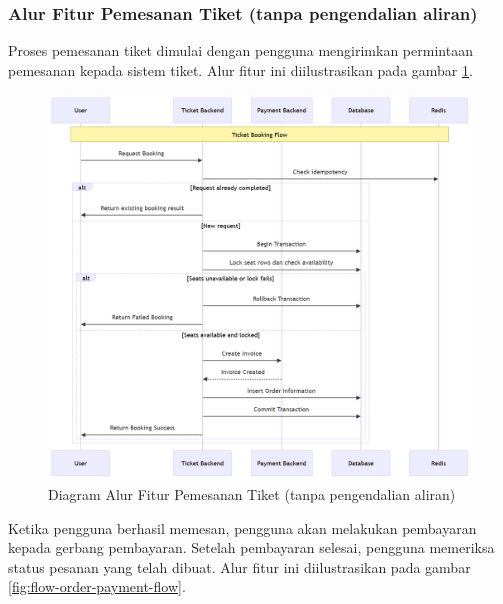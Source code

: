 \pagebreak

\subsubsection{Alur Fitur Pemesanan Tiket (tanpa pengendalian aliran)}

Proses pemesanan tiket dimulai dengan pengguna mengirimkan permintaan pemesanan kepada sistem tiket. Alur fitur ini diilustrasikan pada gambar \ref{fig:flow-book-flow}.

\begin{figure}[htbp]
    \centering
    \includegraphics[width=1\textwidth]{resources/chapter-3/book-flow.png}
    \caption{Diagram Alur Fitur Pemesanan Tiket (tanpa pengendalian aliran)}
    \label{fig:flow-book-flow}
\end{figure}

\pagebreak

Ketika pengguna berhasil memesan, pengguna akan melakukan pembayaran kepada gerbang pembayaran. Setelah pembayaran selesai, pengguna memeriksa status pesanan yang telah dibuat. Alur fitur ini diilustrasikan pada gambar \ref{fig:flow-order-payment-flow}.

